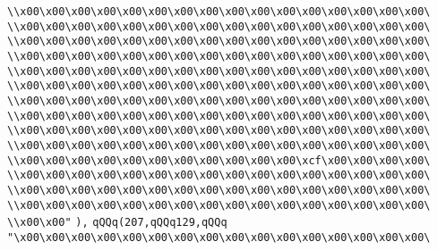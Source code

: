 \verb|\\x00\x00\x00\x00\x00\x00\x00\x00\x00\x00\x00\x00\x00\x00\x00\x00\|\newline
\verb|\\x00\x00\x00\x00\x00\x00\x00\x00\x00\x00\x00\x00\x00\x00\x00\x00\|\newline
\verb|\\x00\x00\x00\x00\x00\x00\x00\x00\x00\x00\x00\x00\x00\x00\x00\x00\|\newline
\verb|\\x00\x00\x00\x00\x00\x00\x00\x00\x00\x00\x00\x00\x00\x00\x00\x00\|\newline
\verb|\\x00\x00\x00\x00\x00\x00\x00\x00\x00\x00\x00\x00\x00\x00\x00\x00\|\newline
\verb|\\x00\x00\x00\x00\x00\x00\x00\x00\x00\x00\x00\x00\x00\x00\x00\x00\|\newline
\verb|\\x00\x00\x00\x00\x00\x00\x00\x00\x00\x00\x00\x00\x00\x00\x00\x00\|\newline
\verb|\\x00\x00\x00\x00\x00\x00\x00\x00\x00\x00\x00\x00\x00\x00\x00\x00\|\newline
\verb|\\x00\x00\x00\x00\x00\x00\x00\x00\x00\x00\x00\x00\x00\x00\x00\x00\|\newline
\verb|\\x00\x00\x00\x00\x00\x00\x00\x00\x00\x00\x00\x00\x00\x00\x00\x00\|\newline
\verb|\\x00\x00\x00\x00\x00\x00\x00\x00\x00\x00\x00\xcf\x00\x00\x00\x00\|\newline
\verb|\\x00\x00\x00\x00\x00\x00\x00\x00\x00\x00\x00\x00\x00\x00\x00\x00\|\newline
\verb|\\x00\x00\x00\x00\x00\x00\x00\x00\x00\x00\x00\x00\x00\x00\x00\x00\|\newline
\verb|\\x00\x00\x00\x00\x00\x00\x00\x00\x00\x00\x00\x00\x00\x00\x00\x00\|\newline
\verb|\\x00\x00"|\newline
\verb|),|\newline
\verb|qQQq(207,qQQq129,qQQq|\newline
\verb|"\x00\x00\x00\x00\x00\x00\x00\x00\x00\x00\x00\x00\x00\x00\x00\x00\|\newline
